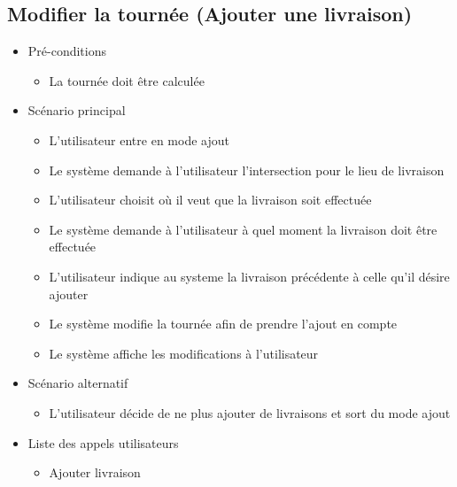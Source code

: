 \documentclass[10pt,a4paper]{book}
\begin{document}
\subsection{Modifier la tournée (Ajouter une livraison)}
\begin{itemize}
	\item{Pré-conditions}
		\begin{itemize}
		\item{La tournée doit être calculée}
	\end{itemize}
	\item{Scénario principal}
	\begin{itemize}
		\item{L’utilisateur entre en mode ajout}
		\item{Le système demande à l’utilisateur l’intersection pour le lieu de livraison}
		\item{L’utilisateur choisit  où il veut que la livraison soit effectuée}
		\item{Le système demande à l’utilisateur à quel moment la livraison doit être effectuée}
		\item{L’utilisateur indique au systeme la livraison précédente à celle qu’il désire ajouter}
		\item{Le système modifie la tournée afin de prendre l’ajout en compte}
		\item{Le système affiche les modifications à l’utilisateur}
	\end{itemize}
	\item{Scénario alternatif}
	\begin{itemize}
				\item L'utilisateur décide de ne plus ajouter de livraisons et sort du mode ajout
			\end{itemize}
	\item{Liste des appels utilisateurs}
	\begin{itemize}
		\item{Ajouter livraison}
	\end{itemize}
\end{itemize}
\end{document}

